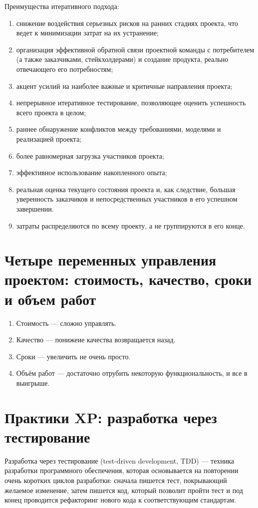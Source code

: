 \documentclass{article}
\let\stdsection\section
\renewcommand\section{\newpage\stdsection}
\begin{document}
    Преимущества итеративного подхода:
    \begin{enumerate}
        \item снижение воздействия серьезных рисков на ранних стадиях проекта, что ведет к минимизации затрат на их устранение;
        \item организация эффективной обратной связи проектной команды с потребителем (а также заказчиками, стейкхолдерами) и создание продукта, реально отвечающего его потребностям;
        \item акцент усилий на наиболее важные и критичные направления проекта;
        \item непрерывное итеративное тестирование, позволяющее оценить успешность всего проекта в целом;
        \item раннее обнаружение конфликтов между требованиями, моделями и реализацией проекта;
        \item более равномерная загрузка участников проекта;
        \item эффективное использование накопленного опыта;
        \item реальная оценка текущего состояния проекта и, как следствие, большая уверенность заказчиков и непосредственных участников в его успешном завершении.
        \item затраты распределяются по всему проекту, а не группируются в его конце.
    \end{enumerate}

\section{Четыре переменных управления проектом: стоимость, качество, сроки и объем работ}
    \begin{enumerate}
        \item Стоимость — сложно управлять.
        \item Качество — понижеие качества возвращается назад.
        \item Сроки — увеличить не очень просто.
        \item Объём работ — достаточно отрубить некоторую функциональность, и все в выигрыше.
    \end{enumerate}

\section{Практики XP: разработка через тестирование}
    Разработка через тестирование (test-driven development, TDD) — техника разработки программного обеспечения, которая основывается на повторении очень коротких циклов разработки: сначала пишется тест, покрывающий желаемое изменение, затем пишется код, который позволит пройти тест и под конец проводится рефакторинг нового кода к соответствующим стандартам.
\end{document}
